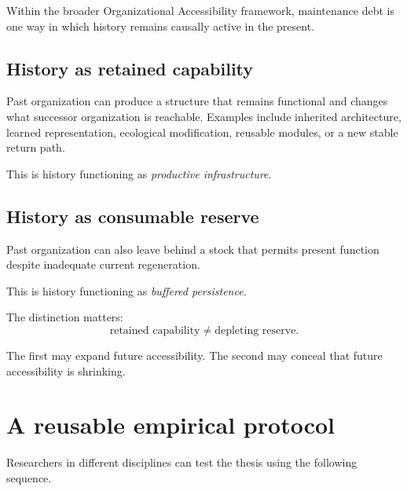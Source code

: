 \documentclass[11pt,a4paper]{article}
\begin{document}
Within the broader Organizational Accessibility framework, maintenance debt is one way in which history remains causally active in the present.

\subsection*{History as retained capability}

Past organization can produce a structure that remains functional and changes what successor organization is reachable. Examples include inherited architecture, learned representation, ecological modification, reusable modules, or a new stable return path.

This is history functioning as \emph{productive infrastructure}.

\subsection*{History as consumable reserve}

Past organization can also leave behind a stock that permits present function despite inadequate current regeneration.

This is history functioning as \emph{buffered persistence}.

The distinction matters:
\begin{equation}
\boxed{
\text{retained capability}
\neq
\text{depleting reserve}.
}
\end{equation}

The first may expand future accessibility. The second may conceal that future accessibility is shrinking.

\section{A reusable empirical protocol}

Researchers in different disciplines can test the thesis using the following sequence.
\end{document}

